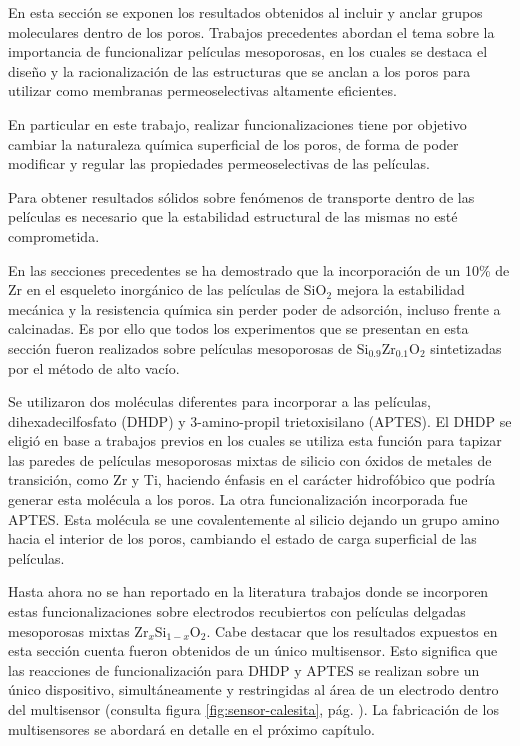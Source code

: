 			En esta sección se exponen los resultados obtenidos al incluir y anclar grupos moleculares dentro de los poros. Trabajos precedentes abordan el tema sobre la importancia de funcionalizar películas mesoporosas, en los cuales se destaca el diseño y la racionalización de las estructuras que se anclan a los poros para utilizar como membranas permeoselectivas altamente eficientes.\cite{Otal2006,Calvo2008,alberti2015,Calvo20210,Dunphy2004} 

			En particular en este trabajo, realizar funcionalizaciones tiene por objetivo cambiar la naturaleza química superficial de los poros, de forma de poder modificar y regular las propiedades permeoselectivas de las películas. 

			Para obtener resultados sólidos sobre fenómenos de transporte dentro de las películas es necesario que la estabilidad estructural de las mismas no esté comprometida. 

			En las secciones precedentes se ha demostrado que la incorporación de un 10\% de Zr en el esqueleto inorgánico de las películas de SiO$_2$ mejora la estabilidad mecánica y la resistencia química sin perder poder de adsorción, incluso frente a \pdmF\space calcinadas. Es por ello que todos los experimentos que se presentan en esta sección fueron realizados sobre películas mesoporosas de  Si$_{0.9}$Zr$_{0.1}$O$_2$ sintetizadas por el método de alto vacío.

			Se utilizaron dos moléculas diferentes para incorporar a las películas, dihexadecilfosfato (DHDP) y 3-amino-propil trietoxisilano (APTES). El DHDP se eligió en base a trabajos previos en los cuales se utiliza esta función para tapizar las paredes de películas mesoporosas mixtas de silicio con óxidos de metales de transición, como Zr y Ti, haciendo énfasis en el carácter hidrofóbico que podría generar esta molécula a los poros.\cite{Angelome2008,Otal2006} La otra funcionalización incorporada fue APTES. Esta molécula se une covalentemente al silicio dejando un grupo amino hacia el interior de los poros, cambiando el estado de carga superficial de las películas. \cite{Calvo2009b,Fattakhova-Rohlfing2007,Andrieu-brunsen2014,Andrieu-Brunsen2015}

		 	Hasta ahora no se han reportado en la literatura trabajos donde se incorporen estas funcionalizaciones sobre electrodos recubiertos con películas delgadas mesoporosas mixtas Zr$_x$Si$_{1-x}$O$_2$. Cabe destacar que los resultados expuestos en esta sección cuenta fueron obtenidos de un único multisensor. Esto significa que las reacciones de funcionalización para DHDP y APTES se realizan sobre un único dispositivo, simultáneamente y restringidas al área de un electrodo dentro del multisensor (consulta figura \ref{fig:sensor-calesita}, pág. \pageref{fig:sensor-calesita}).	La fabricación de los multisensores se abordará en detalle en el próximo capítulo.
	
